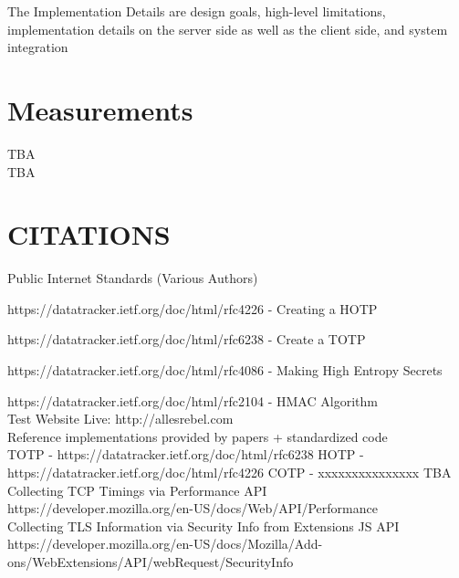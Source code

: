 \documentclass[a4paper, 11pt]{ article}
\begin{document}
\noindent
The Implementation Details are design goals, high-level limitations, implementation details on the server side as well as the client side, and system integration\\



\section{Measurements}
TBA\\
TBA\\









\section{CITATIONS} %
\noindent
Public Internet Standards (Various Authors)

\noindent
https://datatracker.ietf.org/doc/html/rfc4226 - Creating a HOTP

\noindent
https://datatracker.ietf.org/doc/html/rfc6238 - Create a TOTP 

\noindent
https://datatracker.ietf.org/doc/html/rfc4086 - Making High Entropy Secrets

\noindent
https://datatracker.ietf.org/doc/html/rfc2104 - HMAC Algorithm\\

\noindent
Test Website Live: http://allesrebel.com\\ 

\noindent
Reference implementations provided by papers + standardized code\\
TOTP - https://datatracker.ietf.org/doc/html/rfc6238
HOTP - https://datatracker.ietf.org/doc/html/rfc4226 
COTP - xxxxxxxxxxxxxxx TBA\\

\noindent
Collecting TCP Timings via Performance API\\
https://developer.mozilla.org/en-US/docs/Web/API/Performance\\
Collecting TLS Information via Security Info from Extensions JS API\\
https://developer.mozilla.org/en-US/docs/Mozilla/Add-ons/WebExtensions/API/webRequest/SecurityInfo\\
\end{document}
